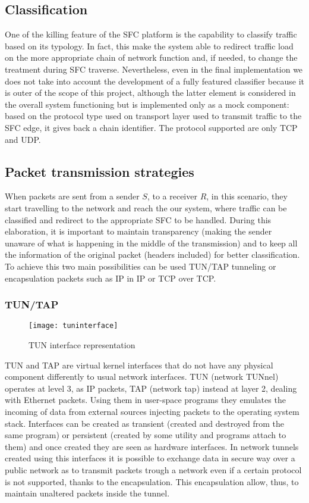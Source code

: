 \subsection{Classification}
One of the killing feature of the SFC platform is the capability to classify
traffic based on its typology. In fact, this make the system able to redirect
traffic load on the more appropriate chain of network function and, if needed,
to change the treatment during SFC traverse. Nevertheless, even in the final
implementation we does not take into account the development of a fully featured
classifier because it is outer of the scope of this project, although the
latter element is considered in the overall system functioning but is
implemented only as a mock component: based on the protocol type used on
transport layer used to transmit traffic to the SFC edge, it gives back a
chain identifier. The protocol supported are only TCP and UDP.

\subsection{Packet transmission strategies}
When packets are sent from a sender $S$, to a receiver $R$, in this scenario,
they start travelling to the network and reach the our system, where traffic can
be classified and redirect to the appropriate SFC to be handled. During this
elaboration, it is important to maintain transparency (making the sender unaware
of what is happening in the middle of the transmission) and to keep all the
information of the original packet (headers included) for better classification.
To achieve this two main possibilities can be used TUN/TAP tunneling or
encapsulation packets such as IP in IP or TCP over TCP.

\subsubsection*{TUN/TAP}
\begin{figure}
  \centering \texttt{[image: tuninterface]}
  \caption{TUN interface representation}
  \label{chap:prjan:img:tun}
\end{figure}
TUN and TAP are virtual kernel interfaces that do not have any physical
component differently to usual network interfaces. TUN (network TUNnel) operates
at level 3, as IP packets, TAP (network tap) instead at layer 2, dealing with
Ethernet packets. Using them in user-space programs they emulates the incoming
of data from external sources injecting packets to the operating system stack.
Interfaces can be created as transient (created and destroyed from the same
program) or persistent (created by some utility and programs attach to them) and
once created they are seen as hardware interfaces. In network tunnels created
using this interfaces it is possible to exchange data in secure way over a
public network as to transmit packets trough a network even if a certain protocol
is not supported, thanks to the encapsulation. This encapsulation allow, thus,
to maintain unaltered packets inside the tunnel.

